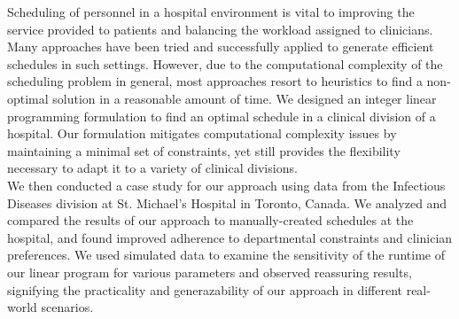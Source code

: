 Scheduling of personnel in a hospital environment is vital to improving the service provided to patients and balancing the workload assigned to clinicians. Many approaches have been tried and successfully applied to generate efficient schedules in such settings. However, due to the computational complexity of the scheduling problem in general, most approaches resort to heuristics to find a non-optimal solution in a reasonable amount of time. We designed an integer linear programming formulation to find an optimal schedule in a clinical division of a hospital. Our formulation mitigates computational complexity issues by maintaining a minimal set of constraints, yet still provides the flexibility necessary to adapt it to a variety of clinical divisions. \\

We then conducted a case study for our approach using data from the Infectious Diseases division at St. Michael's Hospital in Toronto, Canada. We analyzed and compared the results of our approach to manually-created schedules at the hospital, and found improved adherence to departmental constraints and clinician preferences. We used simulated data to examine the sensitivity of the runtime of our linear program for various parameters and observed reassuring results, signifying the practicality and generazability of our approach in different real-world scenarios.